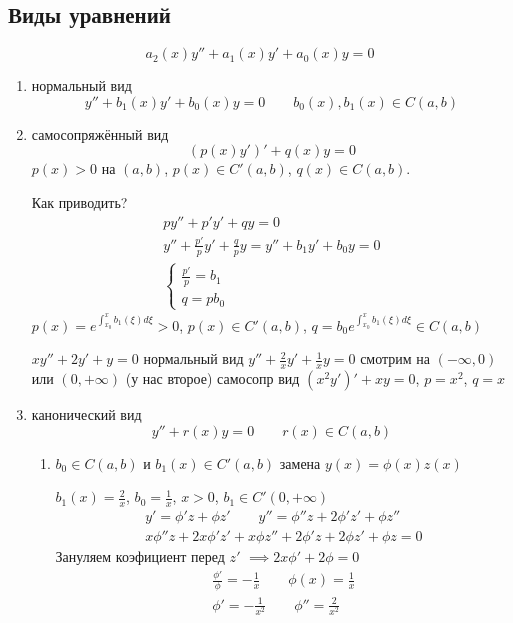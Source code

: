 \documentclass{article}
\begin{document}
\subsection{Виды уравнений}
\[
  a_2(x)y''+a_1(x)y'+a_0(x)y=0
\]
\begin{enumerate}
  \item нормальный вид 
    \[
  y''+b_1(x)y'+b_0(x)y=0 \qquad b_0(x),b_1(x) \in C(a,b)
    \]
  \item самосопряжённый вид
    \[
      (p(x)y')'+q(x)y=0
    \]
    $p(x)>0$ на $(a,b)$, $p(x)\in C'(a,b)$, $q(x)\in C(a,b)$.

    Как приводить?
    \begin{gather*}
      py''+p'y'+qy=0 \\ 
      y'' + \frac{p'}{p}y'+\frac{q}{p}y=y''+b_1y'+b_0y=0 \\
      \left\{\begin{aligned}
        \frac{p'}{p}=b_1 \\ 
        q=pb_0
      \end{aligned}\right.
    \end{gather*}
    $p(x)=e^{\int_{x_0}^{x}b_1(\xi)d\xi} > 0$, $p(x)\in C'(a,b)$, $q=b_0e^{\int_{x_0}^{x}b_1(\xi)d\xi}\in C(a,b)$
    \begin{eg}
      $xy''+2y'+y=0$ нормальный вид $y''+\frac{2}{x}y'+\frac{1}{x}y=0$ 
      смотрим на $(-\infty,0)$ или $(0,+\infty)$ (у нас второе)
      самосопр вид $(x^2y')'+xy=0$, $p=x^{2}$, $q=x$
    \end{eg}
  \item канонический вид
    \[
      y''+r(x)y=0 \qquad r(x) \in C(a,b)
    \]    
    \begin{enumerate}
      \item $b_0 \in C(a,b)$ 
        и $b_1(x)\in C'(a,b)$ замена $y(x)=\phi(x)z(x)$
        \begin{eg}
          $b_1(x)=\frac{2}{x}$, $b_0=\frac{1}{x}$, $x>0$, $b_1 \in C'(0,+\infty)$
          \begin{gather*}
            y'=\phi'z+\phi z' \qquad y''=\phi''z+2\phi'z'+\phi z'' \\ 
            x\phi''z+2x\phi'z'+x\phi z''+2\phi'z+2\phi z'+\phi z=0
          \end{gather*}
          Зануляем коэфициент перед $z'$ $\implies 2x\phi'+2\phi=0$
          \begin{gather*}
            \frac{\phi'}{\phi}=-\frac{1}{x} \qquad \phi(x)=\frac{1}{x} \\ 
            \phi'=-\frac{1}{x^2} \qquad \phi''=\frac{2}{x^2} \\ 

\end{gather*}
\end{eg}
\end{enumerate}
\end{enumerate}
\end{document}
